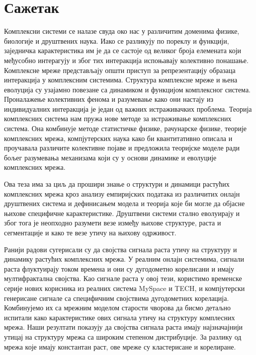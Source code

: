 \normalsize


\sffamily
{}\selectfont

\chapter*{{\selectfont Сажетак}}
\thispagestyle{empty} 

Комплексни системи се налазе свуда око нас у различитим доменима физике, биологије и друштвених наука. Иако се разликују по пореклу и функцији, заједничка карактеристика им је да се састоје од великог броја елемената који међусобно интерагују и због тих интеракција испоњавају колективно понашање. Комплексне мреже представљају општи приступ за репрезентацију образаца интеракција у комплексним системима. Структура комплексне мреже и њена еволуција су узајамно повезане са динамиком и функцијом комплексног система. Проналажење колективних фенома и разумевање како они настају из индивидуалних интеракција је један од важних истраживачких проблема. Теорија комплексних система нам пружа нове методе за истраживање комплексних система. Она комбинује методе статистичке физике, рачунарске физике, теорије комплексних мрежа, компјутерских наука како би квантитативно описала и проучавала различите колективне појаве и предложила теоријске моделе ради бољег разумевања механизама који су у основи динамике и еволуције комплексних мрежа. 

Ова теза има за циљ да прошири знање о структури и динамици растућих комплексних мрежа кроз анализу емпиријских података из различитих онлајн друштвених система и дефинисањем модела и теорија које би могле да објасне њихове специфичне карактеристике. Друштвени системи стално еволуирају и због тога је неопходно разумети везе између њихове структуре, раста и сегментације и како те везе утичу на њихову одрживост.

Ранији радови сугерисали су да својства сигнала раста утичу на структуру и динамику растућих комплексних мрежа. У реалним онлајн системима, сигнали раста флуктуирају током времена и они су дугодометно корелисани и имају мултифрактална својства. Као сигнале раста у овој тези, користимо временске серије нових корисника из реалних система {MySpace} и {TECH}, и компјутерски генерисане сигнале са специфичним својствима дугодометних корелација. Комбинујемо их са мрежним моделом старости чворова да бисмо детаљно испитали како карактеристике ових сигнала утичу на структуру комплесних мрежа. Наши резултати показују да својства сигнала раста имају најзначајнији утицај на структуру мрежа са широким степеном дистрибуције. За разлику од мрежа које имају константан раст, ове мреже су кластерисане и корелиране.

